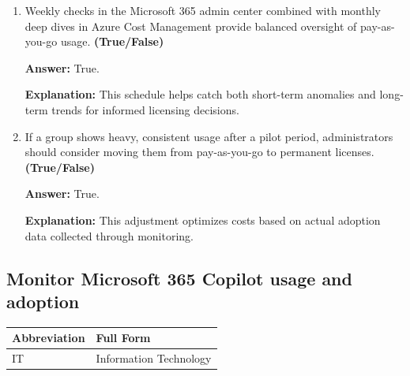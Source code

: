 \documentclass[10pt]{article}
\begin{document}
\begin{enumerate}[leftmargin=*]
\textbf{Explanation:} Early detection through monitoring allows quick remediation before costs balloon further.

\item Weekly checks in the Microsoft 365 admin center combined with monthly deep dives in Azure Cost Management provide balanced oversight of pay-as-you-go usage. \textbf{(True/False)}

\textbf{Answer:} True.

\textbf{Explanation:} This schedule helps catch both short-term anomalies and long-term trends for informed licensing decisions.

\item If a group shows heavy, consistent usage after a pilot period, administrators should consider moving them from pay-as-you-go to permanent licenses. \textbf{(True/False)}

\textbf{Answer:} True.

\textbf{Explanation:} This adjustment optimizes costs based on actual adoption data collected through monitoring.

\end{enumerate}
\clearpage
\subsection{Monitor Microsoft 365 Copilot usage and adoption}

\begin{center}
\begin{tabular}{>{\raggedright\arraybackslash}p{} >{\raggedright\arraybackslash}p{}}
\toprule
\textbf{Abbreviation} & \textbf{Full Form} \\
\midrule
IT & Information Technology \\
\end{tabular}
\end{center}
\end{document}
